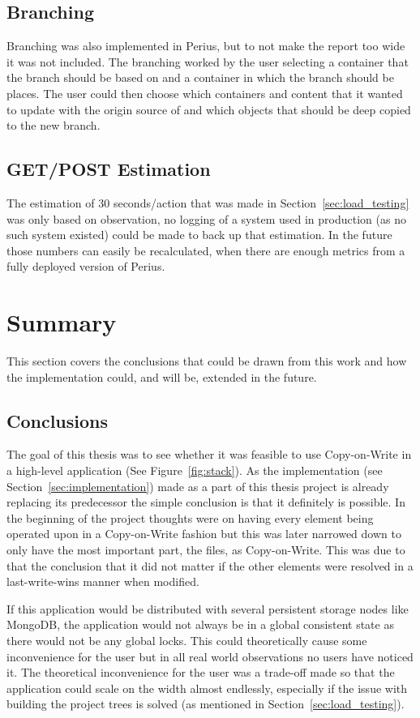 \documentclass[a4paper,12pt]{article}
\begin{document}
\subsection{Branching}
Branching was also implemented in Perius, but to not make the report too wide it was not included.
The branching worked by the user selecting a container that the branch should be based on and a
container in which the branch should be places. The user could then choose which containers and
content that it wanted to update with the origin source of and which objects that should be deep
copied to the new branch.

\subsection{GET/POST Estimation}
The estimation of 30 seconds/action that was made in Section~\ref{sec:load_testing} was only based
on observation, no logging of a system used in production (as no such system existed) could be made 
to back up that estimation. In the future those numbers can easily be recalculated, when there are
enough metrics from a fully deployed version of Perius.

\newpage
\section{Summary}
This section covers the conclusions that could be drawn from this work and how the implementation 
could, and will be, extended in the future.

\subsection{Conclusions}
The goal of this thesis was to see whether it was feasible to use Copy-on-Write in a high-level
application (See Figure~\ref{fig:stack}). As the implementation (see
Section~\ref{sec:implementation}) made as a part of this thesis project is already replacing its
predecessor the simple conclusion is that it definitely is possible. In the beginning of the project
thoughts were on having every element being operated upon in a Copy-on-Write fashion but this was
later narrowed down to only have the most important part, the files, as Copy-on-Write. This was due
to that the conclusion that it did not matter if the other elements were resolved in a
last-write-wins manner when modified.

\par If this application would be distributed with several persistent storage nodes like MongoDB,
the application would not always be in a global consistent state as there would not be any global
locks.  This could theoretically cause some inconvenience for the user but in all real world
observations no users have noticed it. The theoretical inconvenience for the user was a trade-off
made so that the application could scale on the width almost endlessly, especially if the issue with
building the project trees is solved (as mentioned in Section~\ref{sec:load_testing}).
\end{document}
